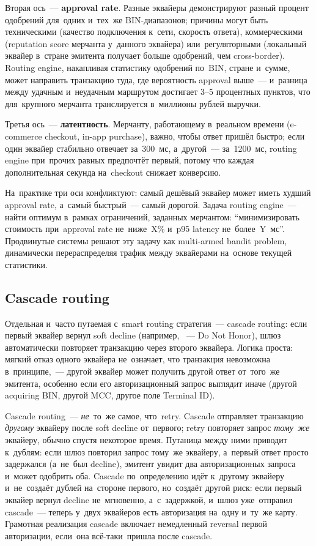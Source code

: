 Вторая ось~--- \textbf{approval rate}. Разные эквайеры
демонстрируют разный процент одобрений для~одних и~тех~же BIN-диапазонов;
причины могут быть техническими (качество подключения к~сети,
скорость ответа), коммерческими (reputation score мерчанта у~данного
эквайера) или~регуляторными (локальный эквайер в~стране эмитента
получает больше одобрений, чем cross-border). Routing engine,
накапливая статистику одобрений по~BIN, стране и~сумме, может
направить транзакцию туда, где вероятность approval выше~---
и~разница между удачным и~неудачным маршрутом достигает 3--5
процентных пунктов, что для~крупного мерчанта транслируется
в~миллионы рублей выручки.

Третья ось~--- \textbf{латентность}. Мерчанту, работающему
в~реальном времени (e-commerce checkout, in-app purchase), важно,
чтобы ответ пришёл быстро; если один эквайер стабильно отвечает
за~300~мс, а~другой~--- за~1200~мс, routing engine при~прочих равных
предпочтёт первый, потому что каждая дополнительная секунда
на~checkout снижает конверсию.

На~практике три оси конфликтуют: самый дешёвый эквайер может иметь
худший approval rate, а~самый быстрый~--- самый дорогой. Задача
routing engine~--- найти оптимум в~рамках ограничений, заданных
мерчантом: \enquote{минимизировать стоимость при~approval rate
  не~ниже~X\% и~p95 latency не~более~Y~мс}. Продвинутые системы
решают эту задачу как multi-armed bandit problem, динамически
перераспределяя трафик между эквайерами на~основе
текущей статистики.

\subsection*{Cascade routing}

Отдельная и~часто путаемая с~smart routing стратегия~--- cascade
routing: если первый эквайер вернул soft decline (например,
~--- Do Not Honor), шлюз автоматически повторяет транзакцию
через второго эквайера. Логика проста: мягкий отказ одного эквайера
не~означает, что транзакция невозможна в~принципе,~--- другой
эквайер может получить другой ответ от~того~же эмитента,
особенно если его авторизационный запрос выглядит иначе (другой
acquiring BIN, другой MCC, другое поле Terminal ID).

\begin{important}
  Cascade routing~--- \emph{не}~то~же самое, что~retry.
  Cascade отправляет транзакцию \emph{другому} эквайеру после soft
  decline от~первого; retry повторяет запрос \emph{тому~же} эквайеру,
  обычно спустя некоторое время. Путаница между ними приводит
  к~дублям: если шлюз повторил запрос тому~же эквайеру, а~первый
  ответ просто задержался (а~не~был decline), эмитент увидит
  два авторизационных запроса и~может одобрить оба. Cascade
  по~определению идёт к~другому эквайеру и~не~создаёт дублей
  на~стороне первого, но~создаёт другой риск: если первый эквайер
  вернул decline не~мгновенно, а~с~задержкой, и~шлюз уже~отправил
  cascade~--- теперь у~двух эквайеров есть авторизация на~одну
  и~ту~же карту. Грамотная реализация cascade включает немедленный
  reversal первой авторизации, если~она всё-таки~пришла после cascade.
\end{important}

